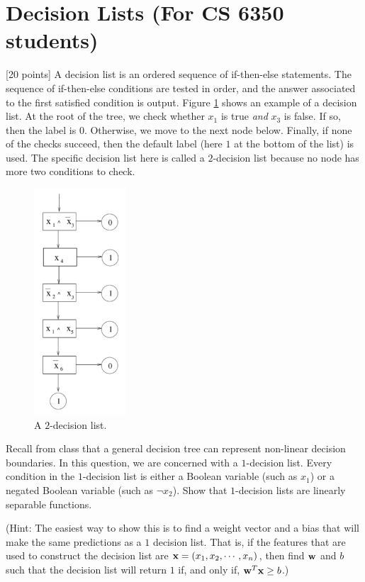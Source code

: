 \section{Decision Lists (For CS 6350 students)}
\label{sec:decision-lists}

[20 points] A decision list is an ordered sequence of if-then-else statements. The
sequence of if-then-else conditions are tested in order, and the
answer associated to the first satisfied condition is output.
%
Figure \ref{fig:decision_list} shows an example of a decision list. At
the root of the tree, we check whether $x_1$ is true {\em and} $x_3$
is false. If so, then the label is $0$. Otherwise, we move to the next
node below. Finally, if none of the checks succeed, then the default
label (here $1$ at the bottom of the list) is used.  The specific
decision list here is called a $2$-decision list because no node has
more two conditions to check.


\begin{figure}[h]
\begin{center}
\includegraphics[width=1.35in]{fig-1.pdf}
\caption{A $2$-decision list.}
\label{fig:decision_list}
\end{center}
\end{figure}

Recall from class that a general decision tree can represent
non-linear decision boundaries.  In this question, we are concerned
with a $1$-decision list. Every condition in the $1$-decision list is
either a Boolean variable (such as $x_1$) or a negated Boolean
variable (such as $\neg x_2$). Show that $1$-decision lists are
linearly separable functions.

(Hint: The easiest way to show this is to find a weight vector and a
bias that will make the same predictions as a $1$ decision list. That
is, if the features that are used to construct the decision list are
${\bf x} = (x_1, x_2, \cdots, x_n)$, then find ${\bf w}$ and $b$ such that the
decision list will return $1$ if, and only if, ${\bf w}^T{\bf x} \geq b$.)




